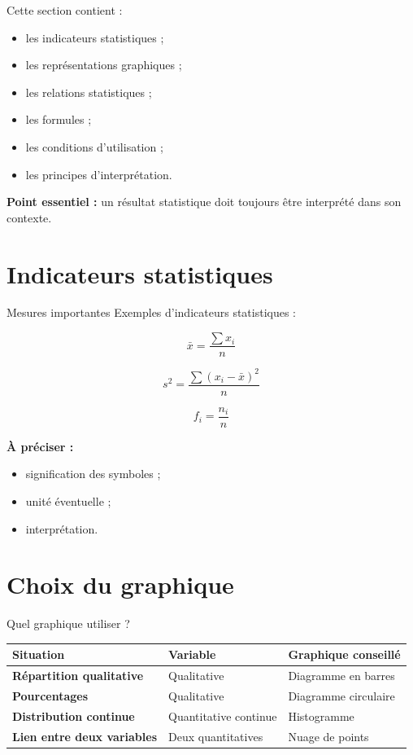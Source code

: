 \documentclass[11pt,a4paper]{article}
\begin{document}
\begin{cadretheorie}
Cette section contient :
\begin{itemize}
    \item les indicateurs statistiques ;
    \item les représentations graphiques ;
    \item les relations statistiques ;
    \item les formules ;
    \item les conditions d’utilisation ;
    \item les principes d’interprétation.
\end{itemize}

\medskip

\textbf{Point essentiel :} un résultat statistique doit toujours être interprété dans son contexte.
\end{cadretheorie}

\section{Indicateurs statistiques}

\begin{cadrevert}{Mesures importantes}
Exemples d’indicateurs statistiques :

\[
\bar{x}=\frac{\sum x_i}{n}
\]

\[
s^2=\frac{\sum (x_i-\bar{x})^2}{n}
\]

\[
f_i=\frac{n_i}{n}
\]

\medskip

\textbf{À préciser :}
\begin{itemize}
    \item signification des symboles ;
    \item unité éventuelle ;
    \item interprétation.
\end{itemize}
\end{cadrevert}

\section{Choix du graphique}

\begin{cadregris}{Quel graphique utiliser ?}
\renewcommand{\arraystretch}{1.35}
\begin{tabularx}{\textwidth}{>{\bfseries}p{4cm}X X}
\toprule
Situation & Variable & Graphique conseillé \\
\midrule
Répartition qualitative & Qualitative & Diagramme en barres \\
Pourcentages & Qualitative & Diagramme circulaire \\
Distribution continue & Quantitative continue & Histogramme \\
Lien entre deux variables & Deux quantitatives & Nuage de points \\
\bottomrule
\end{tabularx}
\end{cadregris}
\end{document}

